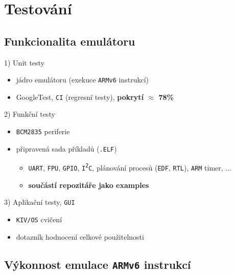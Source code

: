\documentclass[compress]{beamer}
\begin{document}
\section{Testování}

\subsection{Funkcionalita emulátoru}

\begin{frame}
	\begin{block}{1) Unit testy}
		\begin{itemize}
			\item jádro emulátoru (exekuce \texttt{ARMv6} instrukcí)
			\item GoogleTest, \texttt{CI} (regresní testy), \textbf{pokrytí $\approx$ 78\%}
		\end{itemize}
	\end{block}
	\begin{block}{2) Funkční testy}
		\begin{itemize}
			\item \texttt{BCM2835} periferie
			\item připravená sada příkladů (\texttt{.ELF})
			\begin{itemize}
				\item \texttt{UART}, \texttt{FPU}, \texttt{GPIO}, \texttt{I\textsuperscript{2}C}, plánování procesů (\texttt{EDF}, \texttt{RTL}), \texttt{ARM} timer, ...
				\item \textbf{součástí repozitáře jako examples}
			\end{itemize}
		\end{itemize}
	\end{block}
	\begin{block}{3) Aplikační testy, \texttt{GUI}}
		\begin{itemize}
			\item \texttt{KIV/OS} cvičení
			\item dotazník hodnocení celkové použitelnosti
		\end{itemize}
	\end{block}
\end{frame}

\subsection{Výkonnost emulace \texttt{ARMv6} instrukcí}
\end{document}
